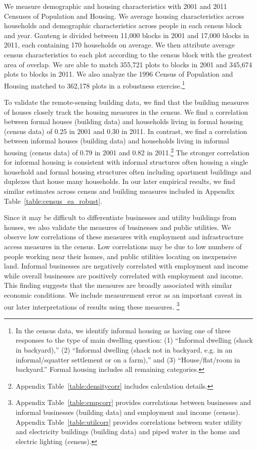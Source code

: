 \documentclass[12pt]{article}
\newcommand{\rv}{}
\begin{document}
We measure demographic and housing characteristics with 2001 and 2011 Censuses of Population and Housing.  We average housing characteristics across households and demographic characteristics across people in each census block and year.  Gauteng is divided between 11,000 blocks in 2001 and 17,000 blocks in 2011, each containing 170 households on average.  We then attribute average census characteristics to each plot according to the census block with the greatest area of overlap.  We are able to match 355,721 plots to blocks in 2001 and 345,674 plots to blocks in 2011.  We also analyze the 1996 Census of Population and Housing matched to 362,178 plots in a robustness exercise.\footnote{\rv{In the census data, we identify informal housing as having one of three responses to the type of main dwelling question: (1) ``Informal dwelling (shack in backyard),'' (2) ``Informal dwelling (shack not in backyard, e.g. in an informal/squatter settlement or on a farm),'' and (3) ``House/flat/room in backyard.''  Formal housing includes all remaining categories.}}

\rv{To validate the remote-sensing building data, we find that the building measures of houses closely track the housing measures in the census.  We find a correlation between formal houses (building data) and households living in formal housing (census data) of 0.25 in 2001 and 0.30 in 2011.  In contrast, we find a correlation between informal houses (building data) and households living in informal housing (census data) of 0.79 in 2001 and 0.82 in 2011.}\footnote{\rv{Appendix Table~\ref{table:densitycorr} includes calculation details.}} \rv{  The stronger correlation for informal housing is consistent with informal structures often housing a single household and formal housing structures often including apartment buildings and duplexes that house many households.  In our later empirical results, we find similar estimates across census and building measures included in Appendix Table~\ref{table:census_ea_robust}.  }

\rv{Since it may be difficult to differentiate businesses and utility buildings from houses, we also validate the measures of businesses and public utilities.  We observe low correlations of these measures with employment and infrastructure access measures in the census.  Low correlations may be due to low numbers of people working near their homes, and public utilities locating on inexpensive land.  Informal businesses are negatively correlated with employment and income while overall businesses are positively correlated with employment and income.  This finding suggests that the measures are broadly associated with similar economic conditions.  We include measurement error as an important caveat in our later interpretations of results using these measures. }\footnote{\rv{Appendix Table~\ref{table:empcorr} provides correlations between businesses and informal businesses (building data) and employment and income (census).  Appendix Table~\ref{table:utilcorr} provides correlations between water utility and electricity buildings (building data) and piped water in the home and electric lighting (census).  }}  
\end{document}
